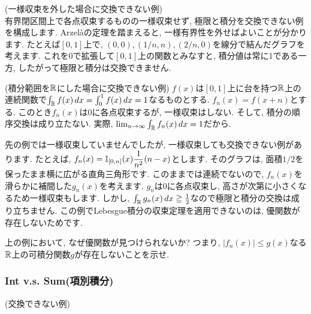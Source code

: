 \begin{eg} (一様収束を外した場合に交換できない例)\\
有界閉区間上で各点収束するものの一様収束せず, 極限と積分を交換できない例を構成します. Arzel\`aの定理を踏まえると, 一様有界性を外せばよいことが分かります. たとえば$[0,1]$上で, $(0,0), (1/n,n), (2/n,0)$を線分で結んだグラフを考えます. これを0で拡張して$[0,1]$上の関数とみなすと, 積分値は常に1である一方, したがって極限と積分は交換できません.
\end{eg}

\begin{eg} (積分範囲を$\mathbb{R}$にした場合に交換できない例)
$f(x)$は$[0,1]$上に台を持つ$\mathbb{R}$上の連続関数で$\int_{\mathbb{R}}f(x)\, dx =  \int_{0}^{1} f(x)\, dx=1$なるものとする. $f_n(x) = f(x+n)$とする. このとき$f_n(x)$は$0$に各点収束するが, 一様収束はしない. そして, 積分の順序交換は成り立たない. 実際, $\lim_{n\to \infty} \int_{\mathbb{R}} f_n(x) \, dx = 1$だから.
\end{eg}

\begin{eg}
先の例では一様収束していませんでしたが, 一様収束しても交換できない例があります. たとえば, $f_n(x) = \mathbb{I}_{[0,n]}(x)\dfrac{1}{n^2}(n-x)$とします. そのグラフは, 面積$1/2$を保ったまま横に広がる直角三角形です. このままでは連続でないので, $f_n(x)$を滑らかに補間した$g_n(x)$を考えます. $g_n$は0に各点収束し, 高さが次第に小さくなるため一様収束もします. しかし, $\int_{\mathbb{R}}g_n(x)\, dx \geqq \frac{1}{2}$なので極限と積分の交換は成り立ちません. この例でLebesgue積分の収束定理を適用できないのは, 優関数が存在しないためです.
\end{eg}

\begin{prac}
上の例において, なぜ優関数が見つけられないか? つまり, $|f_n(x)|\leq g(x)$なる$\mathbb{R}$上の可積分関数$g$が存在しないことを示せ.
\end{prac}


\begin{egprob}

\end{egprob}

\subsubsection{Int v.s. Sum(項別積分)}
\begin{eg} (交換できない例)

\end{eg}
\newpage









